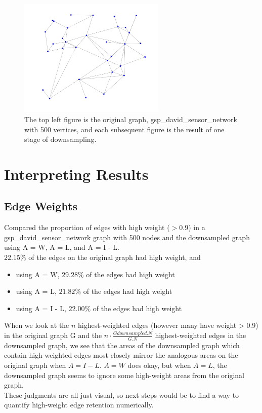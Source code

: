 \documentclass[a4paper]{article}
\begin{document}
\begin{figure}[H]
\includegraphics[width = 7cm]{multiresolution/multires5}

\caption{The top left figure is the original graph, gsp\_david\_sensor\_network with 500 vertices, and each subsequent figure is the result of one stage of downsampling.}
\end{figure}




\section{Interpreting Results}
\subsection{Edge Weights}
Compared the proportion of edges with high weight ($> 0.9$) in a gsp\_david\_sensor\_network graph with 500 nodes and the downsampled graph using A = W, A = L, and A = I - L. \\
$22.15\%$  of the edges on the original graph had high weight, and
\begin{itemize}
\item using A = W, $29.28\%$ of the edges had high weight
\item using A = L, $21.82\%$ of the edges had high weight
\item using A = I - L, $22.00\%$ of the edges had high weight
\end{itemize}
When we look at the $n$ highest-weighted edges (however many have weight > 0.9) in the original graph G and the $n \cdot \frac{G downsampled.N}{G.N}$ highest-weighted edges in the downsampled graph, we see that the areas of the downsampled graph which contain high-weighted edges most closely mirror the analogous areas on the original graph when $A = I - L$. $A = W$ does okay, but when $A = L$, the downsampled graph seems to ignore some high-weight areas from the original graph. \\
These judgments are all just visual, so next steps would be to find a way to quantify high-weight edge retention numerically.
\end{document}
